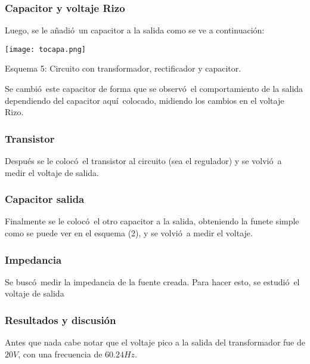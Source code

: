 \documentclass[11pt]{article}
\renewcommand{\=}[1]{\stackrel{#1}{=}} %
\theoremstyle{definition}
\theoremstyle{remark}
\begin{document}
\subsubsection*{Capacitor y voltaje Rizo}
Luego, se le a\~nadi\'o\ un capacitor a la salida como se ve a continuaci\'on:
\begin{center}
\texttt{[image: tocapa.png]}
\end{center}
\begin{center}
Esquema 5: Circuito con transformador, rectificador y capacitor.
\end{center}
Se cambi\'o\ este capacitor de forma que se observ\'o\ el comportamiento de la salida dependiendo del capacitor aqu\'i\ colocado, midiendo los cambios en el voltaje Rizo.

\subsubsection*{Transistor}
Despu\'es se le coloc\'o\ el transistor al circuito (sea el regulador) y se volvi\'o\ a medir el voltaje de salida.

\subsubsection*{Capacitor salida}
Finalmente se le coloc\'o\ el otro capacitor a la salida, obteniendo la funete simple como se puede ver en el esquema (2), y se volvi\'o\ a medir el voltaje.

\subsubsection*{Impedancia}
Se busc\'o\ medir la impedancia de la fuente creada. Para hacer esto, se estudi\'o\ el voltaje de salida
\subsubsection{Resultados y discusi\'on}
Antes que nada cabe notar que el voltaje pico a la salida del transformador fue de $20V$, con una frecuencia de $60.24Hz$.
\end{document}
